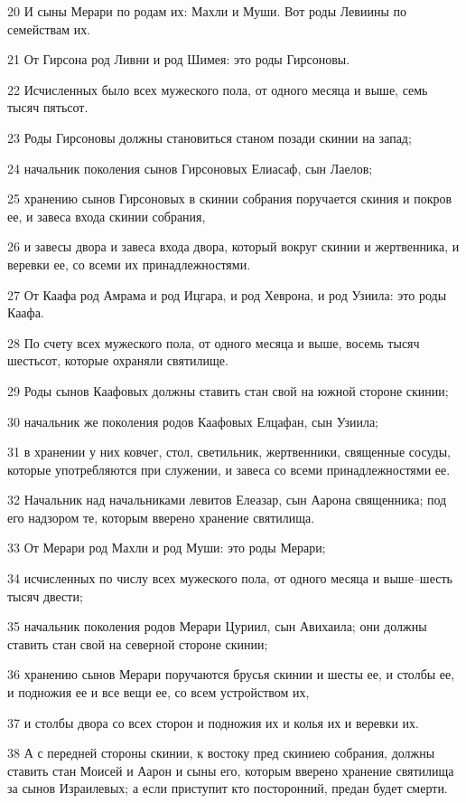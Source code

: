 \par 20 И сыны Мерари по родам их: Махли и Муши. Вот роды Левиины по семействам их.
\par 21 От Гирсона род Ливни и род Шимея: это роды Гирсоновы.
\par 22 Исчисленных было всех мужеского пола, от одного месяца и выше, семь тысяч пятьсот.
\par 23 Роды Гирсоновы должны становиться станом позади скинии на запад;
\par 24 начальник поколения сынов Гирсоновых Елиасаф, сын Лаелов;
\par 25 хранению сынов Гирсоновых в скинии собрания поручается скиния и покров ее, и завеса входа скинии собрания,
\par 26 и завесы двора и завеса входа двора, который вокруг скинии и жертвенника, и веревки ее, со всеми их принадлежностями.
\par 27 От Каафа род Амрама и род Ицгара, и род Хеврона, и род Узиила: это роды Каафа.
\par 28 По счету всех мужеского пола, от одного месяца и выше, восемь тысяч шестьсот, которые охраняли святилище.
\par 29 Роды сынов Каафовых должны ставить стан свой на южной стороне скинии;
\par 30 начальник же поколения родов Каафовых Елцафан, сын Узиила;
\par 31 в хранении у них ковчег, стол, светильник, жертвенники, священные сосуды, которые употребляются при служении, и завеса со всеми принадлежностями ее.
\par 32 Начальник над начальниками левитов Елеазар, сын Аарона священника; под его надзором те, которым вверено хранение святилища.
\par 33 От Мерари род Махли и род Муши: это роды Мерари;
\par 34 исчисленных по числу всех мужеского пола, от одного месяца и выше--шесть тысяч двести;
\par 35 начальник поколения родов Мерари Цуриил, сын Авихаила; они должны ставить стан свой на северной стороне скинии;
\par 36 хранению сынов Мерари поручаются брусья скинии и шесты ее, и столбы ее, и подножия ее и все вещи ее, со всем устройством их,
\par 37 и столбы двора со всех сторон и подножия их и колья их и веревки их.
\par 38 А с передней стороны скинии, к востоку пред скиниею собрания, должны ставить стан Моисей и Аарон и сыны его, которым вверено хранение святилища за сынов Израилевых; а если приступит кто посторонний, предан будет смерти.
